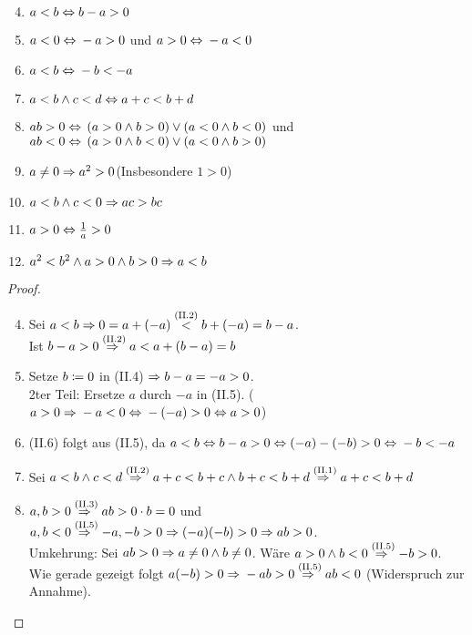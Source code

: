 
\begin{satz}
    \theoremescape
    \begin{enumerate}[label=(II.\arabic*)]
        \setcounter{enumi}{3}
        \item $a<b\equivalent b-a > 0$
        \item $a<0\equivalent -a > 0$ und $a>0\equivalent -a < 0$
        \item $a<b\equivalent -b < -a$
        \item $a<b \land c < d \equivalent a+c<b+d$
        \item $ab > 0 \equivalent \pair{a>0 \land b > 0}\lor\pair{a < 0 \land b < 0}$ und $ab < 0 \equivalent \pair{a>0 \land b < 0}\lor\pair{a < 0 \land b > 0}$
        \item $a\neq 0 \impl a^2 > 0$\quad(Insbesondere $1>0$)
        \item $a<b \land c<0 \impl ac > bc$
        \item $a>0 \equivalent \frac{1}{a}>0$
        \item $a^2 < b^2 \land a > 0 \land b > 0 \impl a < b$
    \end{enumerate}
    \begin{proof}
        \theoremescape
        \begin{enumerate}[label=(II.\arabic*)]
            \setcounter{enumi}{3}
            \item Sei $a<b \impl 0=a+(-a) \annot{<}{(II.2)} b + (-a) = b-a$.\\
            Ist $b-a>0 \annot{\impl}{(II.2)} a<a+(b-a)=b$
            \item Setze $b\definedas 0$ in (II.4) $\impl b-a=-a>0$.\\
            2ter Teil: Ersetze $a$ durch $-a$ in (II.5). ($a>0 \impl -a < 0 \equivalent -(-a)>0 \equivalent a >0$)
            \item (II.6) folgt aus (II.5), da $a<b\equivalent b-a>0 \equivalent (-a)-(-b) > 0\equivalent -b < -a$
            \item Sei $a<b \land c < d \annot{\impl}{(II.2)} a + c < b + c \land b + c < b + d \annot{\impl}{(II.1)} a+c < b + d$
            \item $a,b>0 \annot{\impl}{(II.3)} ab > 0\cdot b = 0$ und $a,b<0 \annot{\impl}{(II.5)} -a,-b>0 \impl (-a)(-b) > 0 \impl ab > 0$.\\
            Umkehrung: Sei $ab>0 \impl a\neq 0 \land b \neq 0$. Wäre $a>0 \land b < 0 \annot{\impl}{(II.5)} -b>0$. Wie gerade gezeigt folgt $a(-b) > 0 \impl -ab > 0 \annot{\impl}{(II.5)} ab < 0$ (Widerspruch zur Annahme).\\

\end{enumerate}
\end{proof}
\end{satz}

